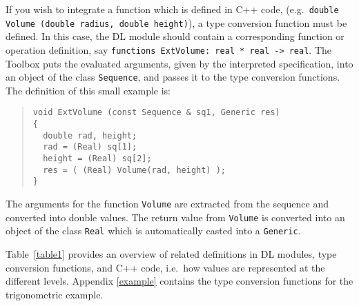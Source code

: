 \documentclass[\pformat,12pt]{article}
\begin{document}
If you wish to integrate a function which is defined in C++ code, (e.g.\
{\tt double} {\tt Volume (double radius, double height)}),
a type conversion function must be defined.
In this case, the DL module should contain a corresponding function or operation
definition, say {\tt functions ExtVolume: real * real -> real}.
The Toolbox puts the evaluated arguments, given by the interpreted 
specification, into an object of the class {\tt Sequence}, and passes it to 
the type conversion functions. The definition of this small example is:

\begin{quote}
\begin{verbatim}
void ExtVolume (const Sequence & sq1, Generic res)
{
  double rad, height;
  rad = (Real) sq[1];
  height = (Real) sq[2];
  res = ( (Real) Volume(rad, height) );
}
\end{verbatim}
\end{quote}

The arguments for the function {\tt Volume} are extracted 
from the sequence and converted into double values. The return value from
{\tt Volume}
is converted into an object of the class {\tt Real} which is automatically
casted into a {\tt Generic}.

Table~\ref{table1} provides an overview of related definitions in DL
modules, type conversion functions, and C++ code, i.e.\ how values are
represented at the different levels.  Appendix \ref{example} contains
the type conversion functions for the trigonometric example.
\end{document}
